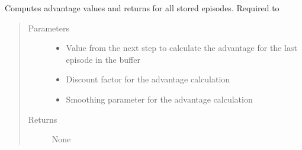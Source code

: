 \documentclass[letterpaper,10pt,english]{sphinxmanual}
\begin{document}
\begin{fulllineitems}
\begin{fulllineitems}
\begin{quote}
\begin{description}
\end{description}\end{quote}

\end{fulllineitems}


\begin{fulllineitems}
\label{\detokenize{agents.reinforcement_learning:agents.reinforcement_learning.ppo_masked.RolloutBuffer.compute_advantages_and_returns}}
\sphinxAtStartPar
Computes advantage values and returns for all stored episodes. Required to
\begin{quote}\begin{description}
\item[{Parameters}] \leavevmode\begin{itemize}
\item {} 
\sphinxAtStartPar
{} \textendash{} Value from the next step to calculate the advantage for the last episode in the buffer

\item {} 
\sphinxAtStartPar
{} \textendash{} Discount factor for the advantage calculation

\item {} 
\sphinxAtStartPar
{} \textendash{} Smoothing parameter for the advantage calculation

\end{itemize}

\item[{Returns}] \leavevmode
\sphinxAtStartPar
None

\end{description}\end{quote}

\end{fulllineitems}



\end{fulllineitems}
\end{document}
